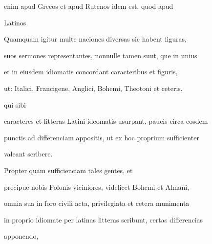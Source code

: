  enim apud Grecos et  apud Rutenos idem est, quod  apud

\splitlines

Latinos.


\indentK Quamquam igitur multe naciones diversas sic habent figuras,

\fulllines

suos sermones representantes, nonnulle tamen sunt, que in unius

et in eiusdem idiomatis concordant caracteribus et figuris,


\splitlines

ut: Italici, Francigene, Anglici, Bohemi, Theotoni et ceteris, 


qui sibi

\fulllines

caracteres et litteras Latini ideomatis usurpant, paucis circa eosdem

punctis ad differenciam appositis, ut ex hoc proprium  sufficienter

\splitlines

valeant scribere.


\indentK Propter quam sufficienciam tales gentes, et

\fulllines

precipue nobis Polonis viciniores, videlicet Bohemi et Almani,

omnia sua in foro civili acta, privilegiata et cetera munimenta

in proprio idiomate per latinas litteras scribunt, certas differencias

\splitlines

apponendo, 

